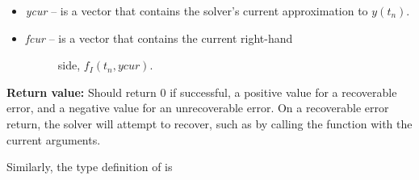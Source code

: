\documentclass[letterpaper,10pt,english]{sphinxmanual}
\begin{document}
\begin{fulllineitems}
\begin{description}
\begin{itemize}
\item {} 
\emph{ycur} -- is a vector that contains the solver's current
approximation to \(y(t_n)\).

\item {} \begin{description}
\item[{\emph{fcur} -- is a vector that contains the current right-hand}] \leavevmode
side, \(f_I(t_n, ycur)\).

\end{description}

\end{itemize}

\end{description}

\textbf{Return value:}  Should return 0 if successful, a positive value
for a recoverable error, and a negative value for an unrecoverable
error.  On a recoverable error return, the solver will attempt to
recover, such as by calling the {\hyperref[linear_solvers/custom:c.lsetup]{\emph{}}} function with
the current arguments.

\end{fulllineitems}


Similarly, the type definition of {\hyperref[linear_solvers/custom:c.msolve]{\emph{}}} is
\end{document}

